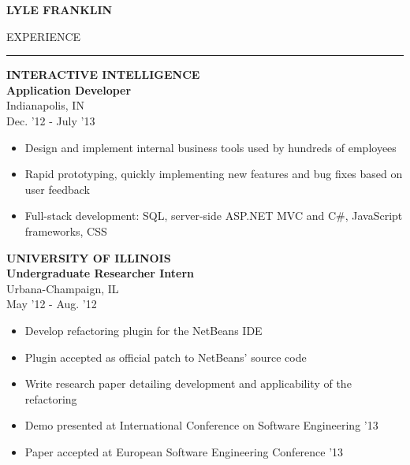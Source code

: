 \documentclass[a4paper,10pt]{article}
\newcommand{\name}[1]{\textbf{\huge{#1}}}
\newcommand{\header}[1]
{
{\Large{\uppercase{#1}}}
\vspace{0.05in}
\hrule
\vspace{0.15in}
}
\newenvironment{details}
{\begin{itemize}[label=\ding{212},leftmargin=0.2in]}
{\end{itemize}}
\begin{document}
\name{LYLE FRANKLIN}
\vspace{0.2in}

\begin{minipage}[t]{0.55\textwidth}
\header{Experience}

\textbf{INTERACTIVE INTELLIGENCE\\Application Developer}\\
Indianapolis, IN\\
Dec. '12 - July '13

\begin{details}
  \item Design and implement internal business tools used by hundreds of employees
  \item Rapid prototyping, quickly implementing new features and bug fixes based on user feedback
  \item Full-stack development: SQL, server-side ASP.NET MVC and C\#, JavaScript frameworks, CSS
\end{details}


\textbf{UNIVERSITY OF ILLINOIS\\Undergraduate Researcher Intern}\\
Urbana-Champaign, IL\\
May '12 - Aug. '12

\begin{details}
  \item Develop refactoring plugin for the NetBeans IDE
  \item Plugin accepted as official patch to NetBeans’ source code
  \item Write research paper detailing development and applicability of the refactoring
  \item Demo presented at International Conference on Software Engineering '13
  \item Paper accepted at European Software Engineering Conference '13
\end{details}


\end{minipage}
\hspace{0.1 in}
\end{document}
